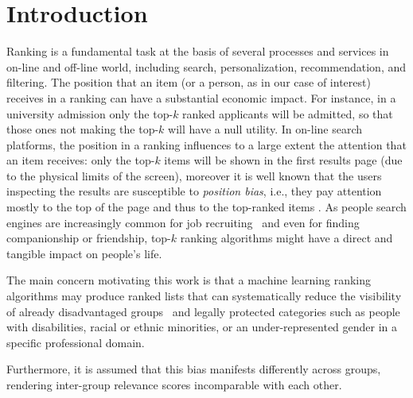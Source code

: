 \section{Introduction}\label{sec:introduction}
Ranking is a fundamental task at the basis of several processes and services in on-line and off-line world, including search, personalization, recommendation, and filtering. The position that an item (or a person, as in our case of interest) receives in a ranking can have a substantial economic impact.
For instance, in a university admission only the top-$k$ ranked applicants will be admitted, so that those ones not making the top-$k$ will have a null utility. In on-line search platforms, the position in a ranking influences to a large extent the attention that an item receives: only the top-$k$ items will be shown in the first results page (due to the physical limits of the screen), moreover it is well known that the users inspecting the results are susceptible to \emph{position bias}, i.e., they pay attention mostly to the top of the page and thus to the top-ranked items \cite{CraswellZTR08}. As people search engines are increasingly common for job recruiting~\cite{raghavan2020mitigating} and even for finding companionship or friendship, top-$k$ ranking algorithms
might have a direct and tangible impact on people's life.




%

%

%



The main concern motivating this work is that a machine learning ranking algorithms may produce ranked lists that can systematically reduce the visibility of already disadvantaged groups~\cite{peder2008,Dwork2012} and legally protected categories such as people with disabilities, racial or ethnic minorities, or an under-represented gender in a specific professional domain.

Furthermore, it is assumed that this bias manifests differently across groups, rendering inter-group relevance scores incomparable with each other.
%

